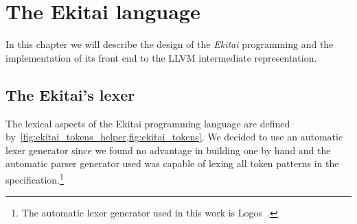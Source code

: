 \documentclass[
  oneside,
  english,
  coorientadorbanca,
  noabntexcite
]{ufsc-thesis-rn46-2019}
\begin{document}
\chapter{The Ekitai language}\label{chapter:proposal}

In this chapter we will describe the design of the \textit{Ekitai} programming and the implementation of its front end to the LLVM intermediate representation.

\section{The Ekitai's lexer}

The lexical aspects of the Ekitai programming language are defined by~\cref{fig:ekitai_tokens_helper,fig:ekitai_tokens}.
We decided to use an automatic lexer generator since we found no advantage in building one by hand and the automatic parser generator used was capable of lexing all token patterns in the specification.\footnote{The automatic lexer generator used in this work is Logos~\cite{logos2020}.}
\end{document}
